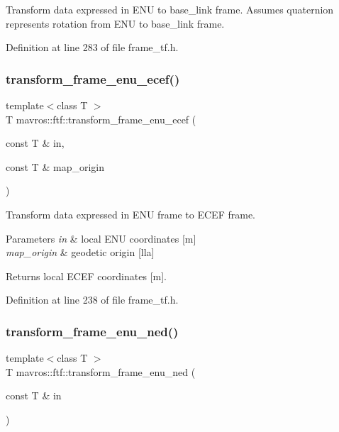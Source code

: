 Transform data expressed in E\+NU to base\+\_\+link frame. Assumes quaternion represents rotation from E\+NU to base\+\_\+link frame. 



Definition at line 283 of file frame\+\_\+tf.\+h.

\mbox{\label{group__nodelib_ga8f46c9063053398c558624755757f1e2}} 
\subsubsection{\texorpdfstring{transform\_frame\_enu\_ecef()}{transform\_frame\_enu\_ecef()}}
{\footnotesize\ttfamily template$<$class T $>$ \\
T mavros\+::ftf\+::transform\+\_\+frame\+\_\+enu\+\_\+ecef (\begin{DoxyParamCaption}\item[{const T \&}]{in,  }\item[{const T \&}]{map\+\_\+origin }\end{DoxyParamCaption})\hspace{0.3cm}{\ttfamily [inline]}}



Transform data expressed in E\+NU frame to E\+C\+EF frame. 


\begin{DoxyParams}{Parameters}
{\em in} & local E\+NU coordinates \mbox{[}m\mbox{]} \\
\hline
{\em map\+\_\+origin} & geodetic origin \mbox{[}lla\mbox{]} \\
\hline
\end{DoxyParams}
\begin{DoxyReturn}{Returns}
local E\+C\+EF coordinates \mbox{[}m\mbox{]}. 
\end{DoxyReturn}


Definition at line 238 of file frame\+\_\+tf.\+h.

\mbox{\label{group__nodelib_ga789377f76104cb6f7665ad368dbba1c9}} 
\subsubsection{\texorpdfstring{transform\_frame\_enu\_ned()}{transform\_frame\_enu\_ned()}}
{\footnotesize\ttfamily template$<$class T $>$ \\
T mavros\+::ftf\+::transform\+\_\+frame\+\_\+enu\+\_\+ned (\begin{DoxyParamCaption}\item[{const T \&}]{in }\end{DoxyParamCaption})\hspace{0.3cm}{\ttfamily [inline]}}



